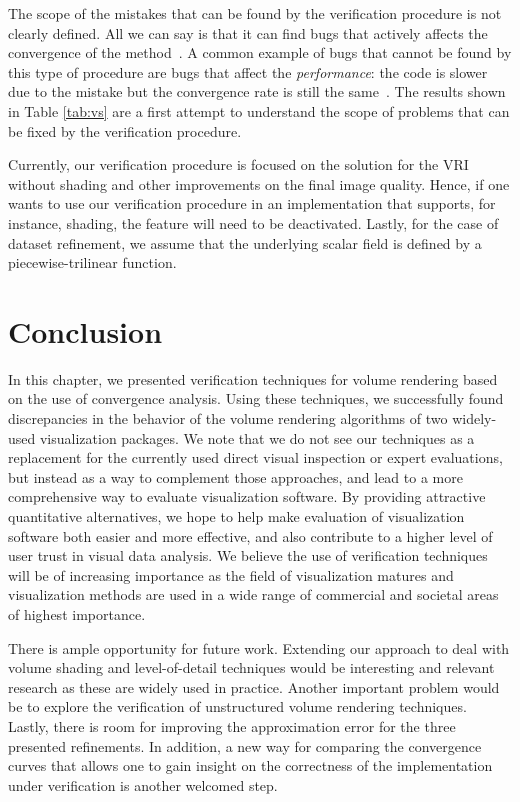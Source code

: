 The scope of the mistakes that can be found by the verification
procedure is not clearly defined. All we can say is that it can find
bugs that actively affects the convergence of the
method~\cite{KnuppSalari02}. A common example of bugs that cannot be
found by this type of procedure are bugs that affect the
\emph{performance}: the code is slower due to the mistake but the
convergence rate is still the same~\cite{roach98}. The results shown in
Table \ref{tab:vs} are a first attempt to understand the scope of problems
that can be fixed by the verification procedure.

Currently, our verification procedure is focused on the solution for
the VRI without shading and other improvements on the final image
quality. Hence, if one wants to use our verification procedure in an
implementation that supports, for instance, shading, the feature will
need to be deactivated. Lastly, for the case of dataset refinement, we
assume that the underlying scalar field is defined by a piecewise-trilinear
function.
\section{Conclusion}
\label{sec:conclusion}

In this chapter, we presented verification techniques for volume rendering
based on the use of convergence analysis. Using these techniques, we
successfully found discrepancies in the behavior of the volume
rendering algorithms of two widely-used visualization packages.  We
note that we do not see our techniques as a replacement for the
currently used direct visual inspection or expert evaluations, but
instead as a way to complement those approaches, and lead to a more
comprehensive way to evaluate visualization software.  By providing
attractive quantitative alternatives, we hope to help make evaluation
of visualization software both easier and more effective, and also
contribute to a higher level of user trust in visual data analysis. We
believe the use of verification techniques will be of increasing
importance as the field of visualization matures and visualization
methods are used in a wide range of commercial and societal areas of
highest importance.

There is ample opportunity for future work. Extending our approach to
deal with volume shading and level-of-detail techniques would be
interesting and relevant research as these are widely used in
practice. Another important problem would be to explore the
verification of unstructured volume rendering techniques. Lastly,
there is room for improving the approximation error for
the three presented refinements. In addition, a new way for comparing
the convergence curves that allows one to gain insight on the
correctness of the implementation under verification is another
welcomed step.
